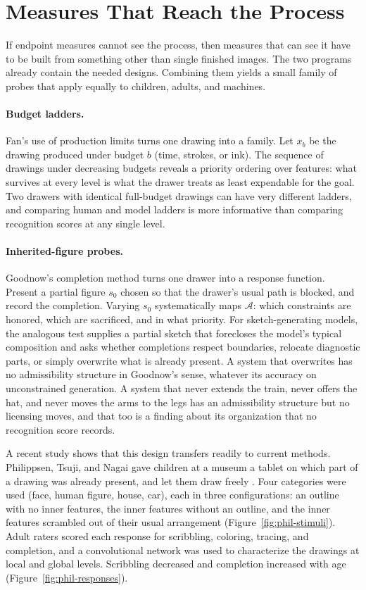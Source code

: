 \documentclass[11pt]{article}
\theoremstyle{remark}
\newcommand{\A}{\mathcal{A}}
\begin{document}
\section{Measures That Reach the Process}
\label{sec:probes}

If endpoint measures cannot see the process, then measures that can see it have to be built from something other than single finished images. The two programs already contain the needed designs. Combining them yields a small family of probes that apply equally to children, adults, and machines.

\paragraph{Budget ladders.} Fan's use of production limits turns one drawing into a family. Let $x_b$ be the drawing produced under budget $b$ (time, strokes, or ink). The sequence of drawings under decreasing budgets reveals a priority ordering over features: what survives at every level is what the drawer treats as least expendable for the goal. Two drawers with identical full-budget drawings can have very different ladders, and comparing human and model ladders is more informative than comparing recognition scores at any single level.

\paragraph{Inherited-figure probes.} Goodnow's completion method turns one drawer into a response function. Present a partial figure $s_0$ chosen so that the drawer's usual path is blocked, and record the completion. Varying $s_0$ systematically maps $\A$: which constraints are honored, which are sacrificed, and in what priority. For sketch-generating models, the analogous test supplies a partial sketch that forecloses the model's typical composition and asks whether completions respect boundaries, relocate diagnostic parts, or simply overwrite what is already present. A system that overwrites has no admissibility structure in Goodnow's sense, whatever its accuracy on unconstrained generation. A system that never extends the train, never offers the hat, and never moves the arms to the legs has an admissibility structure but no licensing moves, and that too is a finding about its organization that no recognition score records.

A recent study shows that this design transfers readily to current methods. Philippsen, Tsuji, and Nagai gave children at a museum a tablet on which part of a drawing was already present, and let them draw freely \cite{philippsen2022}. Four categories were used (face, human figure, house, car), each in three configurations: an outline with no inner features, the inner features without an outline, and the inner features scrambled out of their usual arrangement (Figure~\ref{fig:phil-stimuli}). Adult raters scored each response for scribbling, coloring, tracing, and completion, and a convolutional network was used to characterize the drawings at local and global levels. Scribbling decreased and completion increased with age (Figure~\ref{fig:phil-responses}).
\end{document}
